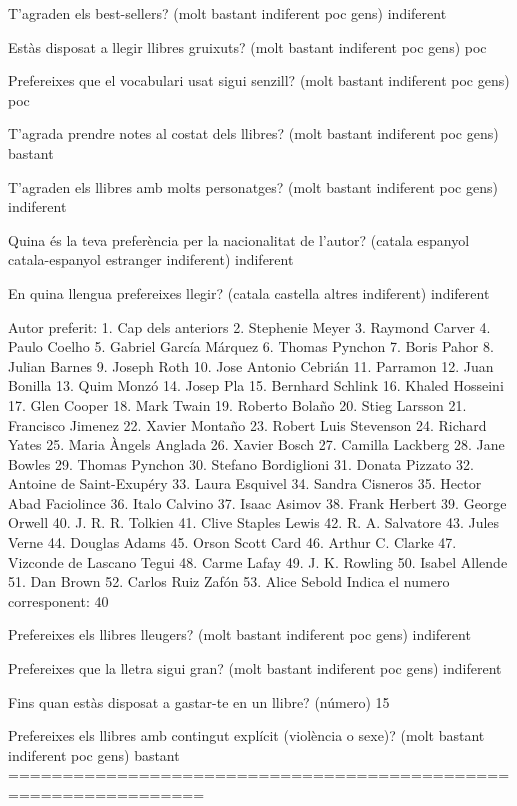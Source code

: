 T'agraden els best-sellers? (molt bastant indiferent poc gens) indiferent

Estàs disposat a llegir llibres gruixuts? (molt bastant indiferent poc gens) poc

Prefereixes que el vocabulari usat sigui senzill? (molt bastant indiferent poc gens) poc

T'agrada prendre notes al costat dels llibres? (molt bastant indiferent poc gens) bastant

T'agraden els llibres amb molts personatges? (molt bastant indiferent poc gens) indiferent

Quina és la teva preferència per la nacionalitat de l'autor? (catala espanyol catala-espanyol estranger indiferent) indiferent

En quina llengua prefereixes llegir? (catala castella altres indiferent) indiferent

Autor preferit: 
  1. Cap dels anteriors
  2. Stephenie Meyer
  3. Raymond Carver
  4. Paulo Coelho
  5. Gabriel García Márquez
  6. Thomas Pynchon
  7. Boris Pahor
  8. Julian Barnes
  9. Joseph Roth
  10. Jose Antonio Cebrián
  11. Parramon
  12. Juan Bonilla
  13. Quim Monzó
  14. Josep Pla
  15. Bernhard Schlink
  16. Khaled Hosseini
  17. Glen Cooper
  18. Mark Twain
  19. Roberto Bolaño
  20. Stieg Larsson
  21. Francisco Jimenez
  22. Xavier Montaño
  23. Robert Luis Stevenson
  24. Richard Yates
  25. Maria Àngels Anglada
  26. Xavier Bosch
  27. Camilla Lackberg
  28. Jane Bowles
  29. Thomas Pynchon
  30. Stefano Bordiglioni
  31. Donata Pizzato
  32. Antoine de Saint-Exupéry
  33. Laura Esquivel
  34. Sandra Cisneros
  35. Hector Abad Faciolince
  36. Italo Calvino
  37. Isaac Asimov
  38. Frank Herbert
  39. George Orwell
  40. J. R. R. Tolkien
  41. Clive Staples Lewis
  42. R. A. Salvatore
  43. Jules Verne
  44. Douglas Adams
  45. Orson Scott Card
  46. Arthur C. Clarke
  47. Vizconde de Lascano Tegui
  48. Carme Lafay
  49. J. K. Rowling
  50. Isabel Allende
  51. Dan Brown
  52. Carlos Ruiz Zafón
  53. Alice Sebold
Indica el numero corresponent: 40

Prefereixes els llibres lleugers? (molt bastant indiferent poc gens) indiferent

Prefereixes que la lletra sigui gran? (molt bastant indiferent poc gens) indiferent

Fins quan estàs disposat a gastar-te en un llibre? (número) 15

Prefereixes els llibres amb contingut explícit (violència o sexe)? (molt bastant indiferent poc gens) bastant
================================================================

